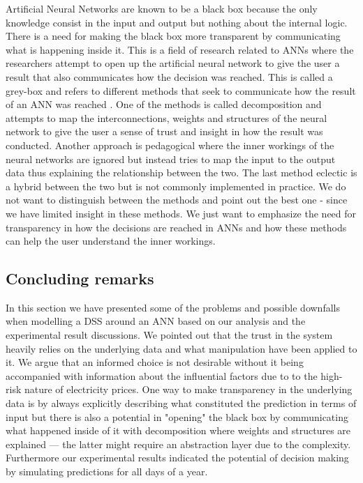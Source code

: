 Artificial Neural Networks are known to be a black box \cite{fromBlackBoxToTransparentBox} because the only knowledge consist in the input and output but nothing about the internal logic. There is a need for making the black box more transparent by communicating what is happening inside it. This is a field of research related to ANNs where the researchers attempt to open up the artificial neural network to give the user a result that also communicates how the decision was reached. This is called a grey-box and refers to different methods that seek to communicate how the result of an ANN was reached \cite{young2010using}. One of the methods is called decomposition and attempts to map the interconnections, weights and structures of the neural network to give the user a sense of trust and insight in how the result was conducted. Another approach is pedagogical where the inner workings of the neural networks are ignored but instead tries to map the input to the output data thus explaining the relationship between the two. The last method eclectic is a hybrid between the two but is not commonly implemented in practice. We do not want to distinguish between the methods and point out the best one - since we have limited insight in these methods. We just want to emphasize the need for transparency in how the decisions are reached in ANNs and how these methods can help the user understand the inner workings.

\subsection{Concluding remarks}
In this section we have presented some of the problems and possible downfalls when modelling a DSS around an ANN based on our analysis and the experimental result discussions. We pointed out that the trust in the system heavily relies on the underlying data and what manipulation have been applied to it. We argue that an informed choice is not desirable without it being accompanied with information about the influential factors due to to the high-risk nature of electricity prices. One way to make transparency in the underlying data is by always explicitly describing what constituted the prediction in terms of input but there is also a potential in "opening" the black box by communicating what happened inside of it with decomposition where weights and structures are explained --- the latter might require an abstraction layer due to the complexity. Furthermore our experimental results indicated the potential of decision making by simulating predictions for all days of a year.

